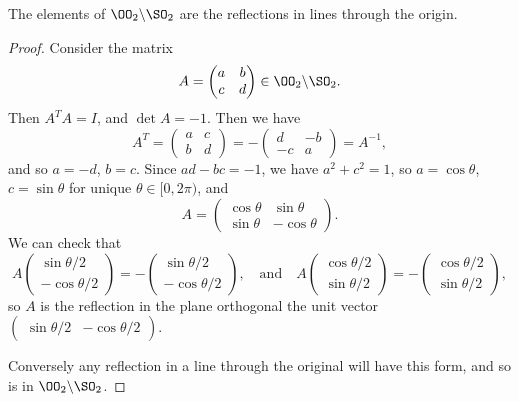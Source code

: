\documentclass[a4]{scrreprt}
\begin{document}
\begin{theorem}
	The elements of $\OO_2 \backslash \SO_2$ are the reflections in lines through the origin.
\end{theorem}
\begin{proof}
	Consider the matrix
	$$
A = \begin{pmatrix}
	a & b \\ c & d
\end{pmatrix} \in \OO_2 \backslash \SO_2.
	$$
	Then $A^T A = I$, and $\det A = -1$. Then we have
	$$
A^T = \begin{pmatrix}
	a & c \\ b & d
\end{pmatrix} = - \begin{pmatrix}
	d & -b \\-c & a
\end{pmatrix} = A^{-1},
	$$
and so $a = -d$, $b = c$. Since $ad - bc = -1$, we have $a^2 + c^2 = 1$, so $a = \cos \theta$, $c = \sin \theta$ for unique $\theta \in [0, 2\pi)$, and
$$
A = \begin{pmatrix}
	\cos \theta & \sin \theta \\
	\sin \theta & - \cos \theta
\end{pmatrix}.
$$
We can check that
$$
A\begin{pmatrix}
	\sin \theta/2 \\
	-\cos \theta/2
\end{pmatrix} = - \begin{pmatrix}
	\sin \theta/2 \\
	-\cos \theta/2
\end{pmatrix},
\quad \text{and}\quad
A\begin{pmatrix}
	\cos \theta/2 \\
	\sin \theta/2
\end{pmatrix} = - \begin{pmatrix}
	\cos \theta/2 \\
	\sin \theta/2
\end{pmatrix},
$$
so $A$ is the reflection in the plane orthogonal the unit vector $\begin{pmatrix}
	\sin \theta/2 & -\cos \theta/2
\end{pmatrix}$. 

Conversely any reflection in a line through the original will have this form, and so is in $\OO_2 \backslash \SO_2$.
\end{proof}
\end{document}
